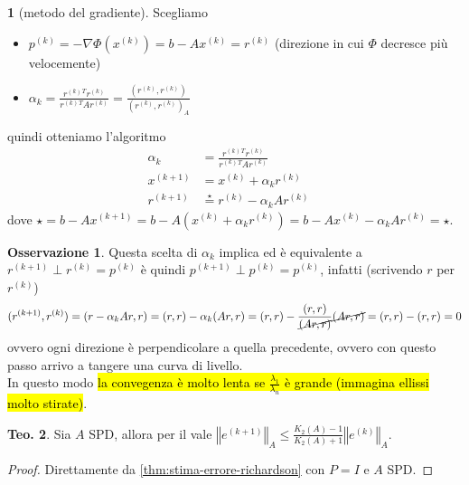 \documentclass[a4paper,10pt]{article}
\theoremstyle{definition}
\theoremstyle{indentdefinition}
\theoremstyle{indenttheorem}
\newtheorem{thm}{Teo.}
\theoremstyle{myremark}
\newtheorem*{rem*}{Osservazione}
\theoremstyle{indentgeneral}
\newtheorem{lyxalgorithm}[thm]{\protect\algorithmname}
\theoremstyle{plain}
\theoremstyle{plain}
\begin{document}
\begin{lyxalgorithm}[metodo del gradiente]
\label{def:metodo-del-gradiente}Scegliamo
\begin{itemize}
    \item $p^{\left(k\right)}  =-\nabla\Phi\left(x^{\left(k\right)}\right)=b-Ax^{\left(k\right)}=r^{\left(k\right)}$ (direzione in cui $\Phi$ decresce più velocemente)
    \item $\alpha_{k}=\frac{r^{\left(k\right)}{}^{T}r^{\left(k\right)}}{r^{\left(k\right)}{}^{T}Ar^{\left(k\right)}}=\frac{(r^{(k)},r^{(k)})}{(r^{(k)},r^{(k)})_A}$ \\
\end{itemize}
quindi otteniamo l'algoritmo
\begin{align*}
    \alpha_{k}&=\frac{r^{\left(k\right)}{}^{T}r^{\left(k\right)}}{r^{\left(k\right)}{}^{T}Ar^{\left(k\right)}} \\
    x^{(k+1)}&=x^{(k)}+\alpha_kr^{(k)} \\
    r^{(k+1)}&\overset{\star}{=}r^{(k)}-\alpha_kAr^{(k)} \quad 
\end{align*}
dove $\star=b-Ax^{(k+1)}=b-A(x^{(k)}+\alpha_kr^{(k)})=b-Ax^{(k)}-\alpha_kAr^{(k)}=\star$.
\end{lyxalgorithm}

\begin{rem*}
    Questa scelta di $\alpha_k$ implica ed è equivalente  a $r^{(k+1)}\perp r^{(k)}=p^{(k)}$ è quindi $p^{(k+1)}\perp p^{(k)}=p^{(k)}$, infatti (scrivendo $r$ per $r^{(k)}$)
\begin{align*}
    (r^{(k+1)},r^{(k)})=(r-\alpha_kAr,r)=(r,r)-\alpha_k(Ar,r)=(r,r)-\frac{(r,r)}{\cancel{(Ar,r)}}\cancel{(Ar,r)}=(r,r)-(r,r)=0
\end{align*}
ovvero ogni direzione è perpendicolare a quella precedente, ovvero con questo passo  arrivo a tangere una curva di livello. \\
    In questo modo \hl{la convegenza è molto lenta se $\frac{\lambda_1}{\lambda_n}$ è grande (immagina ellissi molto stirate)}.
\end{rem*}

\begin{thm}
\label{thm:stima-errore-gradiente}Sia $A$ SPD, allora per il 
vale $\left\Vert e^{\left(k+1\right)}\right\Vert _{A}\leq\frac{K_{2}\left(A\right)-1}{K_{2}\left(A\right)+1}\left\Vert e^{\left(k\right)}\right\Vert _{A}$.
\end{thm}

\begin{proof}
Direttamente da \ref{thm:stima-errore-richardson} con $P=I$ e $A$
SPD.
\end{proof}
\end{document}
